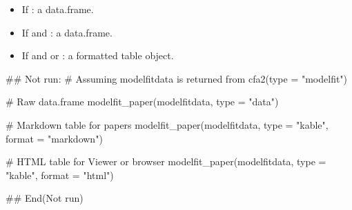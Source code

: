 \documentclass[a4paper]{book}
\begin{document}
%
\begin{Value}
\begin{itemize}

\item{} If : a data.frame.
\item{} If  and : a data.frame.
\item{} If  and  or
: a formatted table object.

\end{itemize}

\end{Value}
%
\begin{Examples}
\begin{ExampleCode}
\#\# Not run: 
# Assuming modelfitdata is returned from cfa2(type = "modelfit")

# Raw data.frame
modelfit_paper(modelfitdata, type = "data")

# Markdown table for papers
modelfit_paper(modelfitdata, type = "kable", format = "markdown")

# HTML table for Viewer or browser
modelfit_paper(modelfitdata, type = "kable", format = "html")

## End(Not run)
\end{ExampleCode}
\end{Examples}
\end{document}
